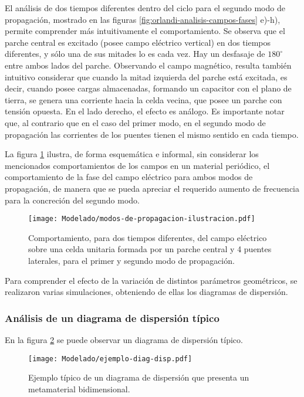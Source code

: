 El análisis de dos tiempos diferentes dentro del ciclo para el segundo modo de propagación, mostrado en las figuras \ref{fig:orlandi-analisis-campos-fases} e)-h), permite comprender más intuitivamente el comportamiento. Se observa que el parche central es excitado (posee campo eléctrico vertical) en dos tiempos diferentes, y sólo una de sus mitades lo es cada vez. Hay un desfasaje de $180^\circ$ entre ambos lados del parche. Observando el campo magnético, resulta también intuitivo considerar que cuando la mitad izquierda del parche está excitada, es decir, cuando posee cargas almacenadas, formando un capacitor con el plano de tierra, se genera una corriente hacia la celda vecina, que posee un parche con tensión opuesta. En el lado derecho, el efecto es análogo. Es importante notar que, al contrario que en el caso del primer modo, en el segundo modo de propagación las corrientes de los puentes tienen el mismo sentido en cada tiempo.

La figura \ref{fig:dibujito-modos} ilustra, de forma esquemática e informal, sin considerar los mencionados comportamientos de los campos en un material periódico, el comportamiento de la fase del campo eléctrico para ambos modos de propagación, de manera que se pueda apreciar el requerido aumento de frecuencia para la concreción del segundo modo.

\begin{figure}[h]
	\centering
	\texttt{[image: Modelado/modos-de-propagacion-ilustracion.pdf]}
	\caption{Comportamiento, para dos tiempos diferentes, del campo eléctrico sobre una celda unitaria formada por un parche central y 4 puentes laterales, para el primer y segundo modo de propagación.}
	\label{fig:dibujito-modos}
\end{figure}


Para comprender el efecto de la variación de distintos parámetros geométricos, se realizaron varias simulaciones, obteniendo de ellas los diagramas de dispersión.

\subsubsection{Análisis de un diagrama de dispersión típico}

En la figura \ref{fig:diag-dispersion-tipico} se puede observar un diagrama de dispersión típico.

\begin{figure}[h]
	\centering
	\texttt{[image: Modelado/ejemplo-diag-disp.pdf]}
	\caption{Ejemplo típico de un diagrama de dispersión que presenta un metamaterial bidimensional.}
	\label{fig:diag-dispersion-tipico}
\end{figure}

